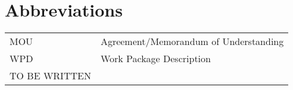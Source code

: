 \appendix
\chapter{Abbreviations}

\begin{tabular}{l l}
MOU & Agreement/Memorandum of Understanding \\
WPD & Work Package Description \\

TO BE WRITTEN


\end{tabular}
